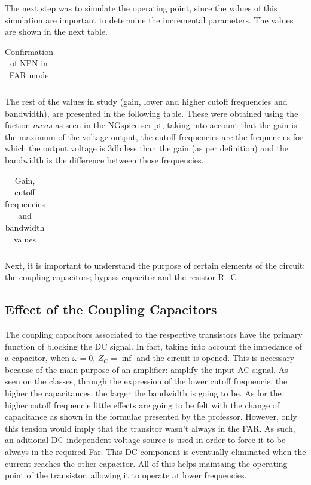 \par The next step was to simulate the operating point, since the values of this simulation are important to determine the incremental parameters. The values are shown in the next table.

\begin{table}[ht]
  \centering
  \begin{tabular}{|l|r|}
    \hline    
   
     \end{tabular}
  \caption{Confirmation of NPN in FAR mode}
  \label{tab:op}
    
\end{table}

\par The rest of the values in study (gain, lower and higher cutoff frequencies and bandwidth),  are presented in the following table. These were obtained using the fuction $meas$ as seen in the NGspice script, taking into account that the gain is the maximum of the voltage output, the cutoff frequencies are the frequencies for which the output voltage is 3db less than the gain (as per definition) and the bandwidth is the difference between those frequencies.

\begin{table}[ht]
  \centering
  \begin{tabular}{|l|r|}
    \hline    
   
    \end{tabular}
  \caption{Gain, cutoff frequencies and bandwidth values}
    \label{tab:results}
\end{table}

\par Next, it is important to understand the purpose of certain elements of the circuit: the coupling capacitors; bypass capacitor and the resistor R_C 

\subsection{Effect of the Coupling Capacitors}

\par The coupling capacitors associated to the respective transistors have the primary function of blocking the DC signal. In fact, taking into account the impedance of a capacitor, when $\omega=0$, $Z_C=\inf$ and the circuit is opened. This is necessary because of the main purpose of an amplifier: amplify the input AC signal. As seen on the classes, through the expression of the lower cutoff frequencie, the higher the capacitances, the larger the bandwidth is going to be. As for the higher cutoff frequencie little effects are going to be felt with the change of capacitance as shown in the formulae presented by the professor. However, only this tension would imply that the transitor wasn't always in the FAR. As such, an aditional DC independent voltage source is used in order to force it to be always in the required Far. This DC component is eventually eliminated when the current reaches the other capacitor. All of this helps maintaing the operating point of the transistor, allowing it to operate at lower frequencies.

